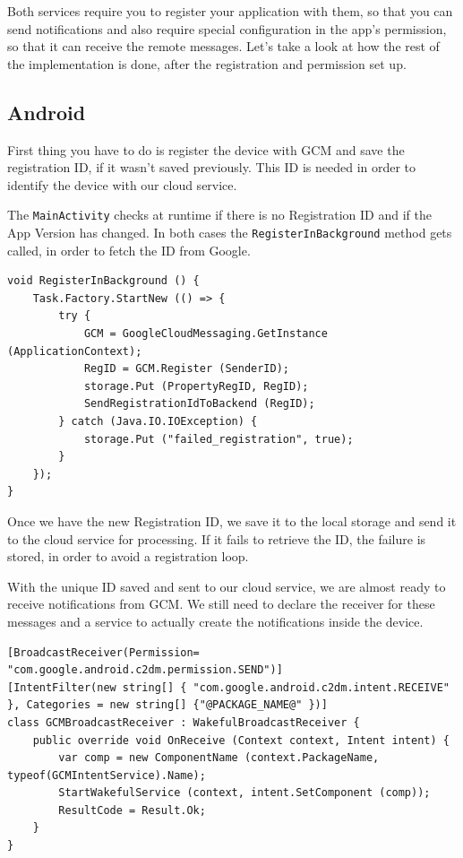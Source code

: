 Both services require you to register your application with them, so that you can send notifications and also require special configuration in the app's permission, so that it can receive the remote messages. Let's take a look at how the rest of the implementation is done, after the registration and permission set up.


\subsection{Android}

First thing you have to do is register the device with \ac{GCM} and save the registration ID, if it wasn't saved previously. This ID is needed in order to identify the device with our cloud service.

The \texttt{MainActivity} checks at runtime if there is no Registration ID and if the App Version has changed. In both cases the \texttt{RegisterInBackground} method gets called, in order to fetch the ID from Google.

\begin{lstlisting}[frame=lt,caption=GCM Registration, label={list:reg_and}]
void RegisterInBackground () {
	Task.Factory.StartNew (() => {
		try {
			GCM = GoogleCloudMessaging.GetInstance (ApplicationContext);
			RegID = GCM.Register (SenderID);
			storage.Put (PropertyRegID, RegID);
			SendRegistrationIdToBackend (RegID);
		} catch (Java.IO.IOException) {
			storage.Put ("failed_registration", true);
		}	
	});
}
\end{lstlisting}

Once we have the new Registration ID, we save it to the local storage and send it to the cloud service for processing. If it fails to retrieve the ID, the failure is stored, in order to avoid a registration loop.

With the unique ID saved and sent to our cloud service, we are almost ready to receive notifications from \ac{GCM}. We still need to declare the receiver for these messages and a service to actually create the notifications inside the device.\vfill

\begin{lstlisting}[frame=lt,caption=GCMBroadcastReceiver.cs, label={list:reg_and_broad}]
[BroadcastReceiver(Permission= "com.google.android.c2dm.permission.SEND")]
[IntentFilter(new string[] { "com.google.android.c2dm.intent.RECEIVE" }, Categories = new string[] {"@PACKAGE_NAME@" })]
class GCMBroadcastReceiver : WakefulBroadcastReceiver {
	public override void OnReceive (Context context, Intent intent) {
		var comp = new ComponentName (context.PackageName, typeof(GCMIntentService).Name);
		StartWakefulService (context, intent.SetComponent (comp));
		ResultCode = Result.Ok;
	}
}
\end{lstlisting}

